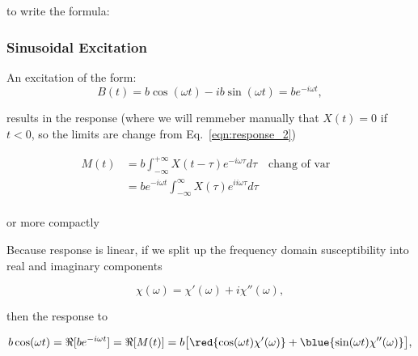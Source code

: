   \noindent to write the formula:
  
 
 \subsubsection{Sinusoidal Excitation}
  An excitation of the form:
  \begin{equation}\label{key}
  	B(t) = b\cos(\omega t) - ib\sin(\omega t) = be^{-i\omega t},
  \end{equation}
  
  \noindent results in the response (where we will remmeber manually that $ X(t) = 0 $ if $ t<0 $, so the limits are change from Eq.~\eqref{eqn:response_2})
  
  \begin{equation}
  	\begin{aligned}
  	M(t) &= b\int_{-\infty}^{+\infty}X(t - \tau)e^{-i\omega \tau}d\tau\quad\text{chang of var}&\\
  	& = be^{-i\omega t}\int_{-\infty}^{\infty}X(\tau)e^{ii\omega\tau}d\tau&\\
  	\end{aligned}
  \end{equation}
  
  \noindent or more compactly
	
	\noindent Because response is linear, if we split up the frequency domain susceptibility into real and imaginary components
	
	\begin{equation}\label{key}
		\chi(\omega) = \chi'(\omega) + i\chi''(\omega),
	\end{equation}
	
	\noindent then the response to
	
	\begin{equation}\label{eqn:response_4}
	  b\cos(\omega t) = \Re[be^{-i\omega t}]  =\Re[M(t)] = b\big[\red{\cos(\omega t)\chi'(\omega)} + \blue{\sin(\omega t)\chi''(\omega)}\big],
	\end{equation}
	
